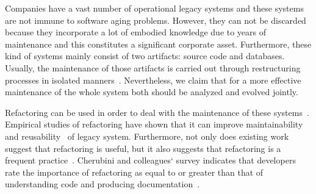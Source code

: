 Companies have a vast number of operational legacy systems and these systems are not immune to software aging problems. However, they can not be discarded because they incorporate a lot of embodied knowledge due to years of maintenance and this constitutes a significant corporate asset. Furthermore, these kind of systems mainly consist of two artifacts: source code and databases. Usually, the maintenance of those artifacts is carried out through restructuring processes in isolated manners~\cite{Griffith2011}. Nevertheless, we claim that for a more effective maintenance of the whole system both should be analyzed and evolved jointly. 

Refactoring can be used in order to deal with the maintenance of these systems~\cite{refactImpro}. %
 Empirical studies of refactoring have shown that it can improve maintainability~\cite{1510132} and reusability~\cite{Moser:2006} of legacy system. Furthermore, not only does existing work suggest that refactoring is useful, but it also suggests that refactoring is a frequent practice~\cite{Murphy:2011}. Cherubini and colleagues` survey indicates that developers rate the importance of refactoring as equal to or greater than that of understanding code and producing documentation~\cite{Cherubini:2007}.

